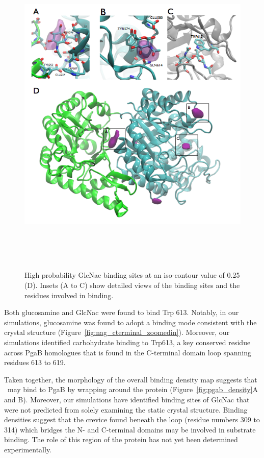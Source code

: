 \begin{figure}[htbp]
\centering
\includegraphics[height=6.29in, width=6.12in]{figures/results4/figure_pgab_binding_sites.png}
\caption[GlcNac binding sites]{High probability GlcNac binding sites at an iso-contour value of 0.25 (D). Insets (A to C) show detailed views of the binding sites and the residues involved in binding.}
\label{fig:pgab_binding_sites}
\end{figure}

Both glucosamine and GlcNac were found to bind Trp 613. Notably, in our simulations, glucosamine was found to adopt a binding mode consistent with the crystal structure (Figure~\ref{fig:nag_cterminal_zoomedin}). Moreover, our simulations identified carbohydrate binding to Trp613, a key conserved residue across PgaB homologues that is found in the C-terminal domain loop spanning residues 613 to 619.

Taken together, the morphology of the overall binding density map suggests that \pnag\ may bind to PgaB by wrapping around the protein (Figure~\ref{fig:pgab_density}A and B). Moreover, our simulations have identified binding sites of GlcNac that were not predicted from solely examining the static crystal structure. Binding densities suggest that the crevice found beneath the loop (residue numbers 309 to 314) which bridges the N- and C-terminal domains may be involved in substrate binding. The role of this region of the protein has not yet been determined experimentally. 



